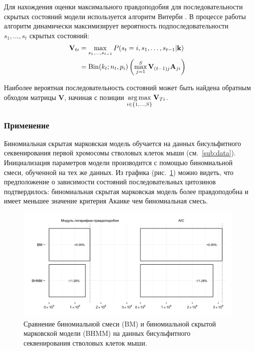 Для нахождения оценки максимального правдоподобия для последовательности
скрытых состояний модели используется алгоритм Витерби \cite{Rabiner1989}. В процессе работы
алгоритм динамически максимизирует вероятность подпоследовательности
$s_1, \ldots, s_t$ скрытых состояний:
\begin{align*}
  \mathbf{V}_{ti}
  &= \max\limits_{s_1, \ldots, s_{t- 1}} P(s_t = i, s_1, \ldots, s_{t - 1}| \mathbf{k}) \\
  &= \operatorname{Bin}(k_t; n_t, p_i) \left(
         \max\limits_{j = 1}^S \mathbf{V}_{(t - 1)j} \mathbf{A}_{ji}
     \right)
\end{align*}

Наиболее вероятная последовательность состояний может быть найдена
обратным обходом матрицы $\mathbf{V}$, начиная с позиции
$\operatorname*{arg\,max}\limits_{i \in \{1, \ldots, S\}} \mathbf{V}_{T i}$.


\subsubsection{Применение}
\label{bhmm:applications}

Биномиальная скрытая марковская модель обучается на данных бисульфитного секвенирования
первой хромосомы стволовых клеток мыши (см.~\ref{sub:data}). Инициализация параметров модели
производится с помощью биномиальной смеси, обученной на тех же данных. Из графика
(рис.~\ref{fig:bm-bhmm}) можно видеть, что предположение о зависимости состояний последовательных
цитозинов подтвердилось: биномиальная скрытая марковская модель более правдоподобна и имеет
меньшее значение критерия Акаике чем биномиальная смесь.

\begin{figure}[h]
  \centering
  \includegraphics[width=\textwidth]{images/bm-bhmm}
  \caption{Сравнение биномиальной смеси (BM) и биномиальной скрытой марковской модели (BHMM)
    на данных бисульфитного секвенирования стволовых клеток мыши.}
  \label{fig:bm-bhmm}
\end{figure}


